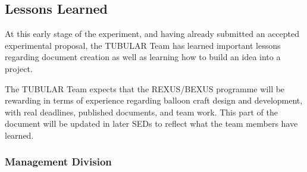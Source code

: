 \pagebreak
\subsection{Lessons Learned}
At this early stage of the experiment, and having already submitted an accepted experimental proposal, the TUBULAR Team has learned important lessons regarding document creation as well as learning how to build an idea into a project. \par
The TUBULAR Team expects that the REXUS/BEXUS programme will be rewarding in terms of experience regarding balloon craft design and development, with real deadlines, published documents, and team work. This part of the document will be updated in later SEDs to reflect what the team members have learned.

\subsubsection{Management Division}


